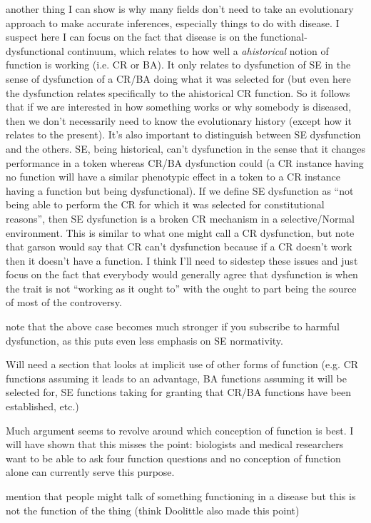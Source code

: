 \documentclass{article}
\begin{document}
another thing I can show is why many fields don't need to take an evolutionary approach to make accurate inferences, especially things to do with disease. I suspect here I can focus on the fact that disease is on the functional-dysfunctional continuum, which relates to how well a \emph{ahistorical} notion of function is working (i.e. CR or BA). It only relates to dysfunction of SE in the sense of dysfunction of a CR/BA doing what it was selected for (but even here the dysfunction relates specifically to the ahistorical CR function. So it follows that if we are interested in how something works or why somebody is diseased, then we don't necessarily need to know the evolutionary history (except how it relates to the present). It's also important to distinguish between SE dysfunction and the others. SE, being historical, can't dysfunction in the sense that it changes performance in a token whereas CR/BA dysfunction could (a CR instance having no function will have a similar phenotypic effect in a token to a CR instance having a function but being dysfunctional). If we define SE dysfunction as ``not being able to perform the CR for which it was selected for constitutional reasons'', then SE dysfunction is a broken CR mechanism in a selective/Normal environment. This is similar to what one might call a CR dysfunction, but note that garson would say that CR can't dysfunction because if a CR doesn't work then it doesn't have a function. I think I'll need to sidestep these issues and just focus on the fact that everybody would generally agree that dysfunction is when the trait is not ``working as it ought to'' with the ought to part being the source of most of the controversy.

note that the above case becomes much stronger if you subscribe to harmful dysfunction, as this puts even less emphasis on SE normativity.

Will need a section that looks at implicit use of other forms of function (e.g. CR functions assuming it leads to an advantage, BA functions assuming it will be selected for, SE functions taking for granting that CR/BA functions have been established, etc.)

Much argument seems to revolve around which conception of function is best. I will have shown that this misses the point: biologists and medical researchers want to be able to ask four function questions and no conception of function alone can currently serve this purpose.

mention that people might talk of something functioning in a disease but this is not the function of the thing (think Doolittle also made this point)
\end{document}
